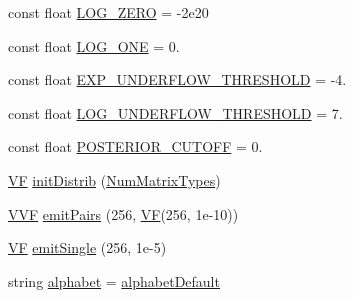 \begin{DoxyCompactItemize}
\item 
const float \hyperlink{namespace_p_r_o_b_c_o_n_s_ae5514101b91c6ae08ed2ee9306d2305d}{L\+O\+G\+\_\+\+Z\+E\+R\+O} = -\/2e20
\item 
const float \hyperlink{namespace_p_r_o_b_c_o_n_s_a5b8b50011bc3908106307aacd3a58d6e}{L\+O\+G\+\_\+\+O\+N\+E} = 0.
\item 
const float \hyperlink{namespace_p_r_o_b_c_o_n_s_a4074cb3928409c0f0b0d7fce9d2576b0}{E\+X\+P\+\_\+\+U\+N\+D\+E\+R\+F\+L\+O\+W\+\_\+\+T\+H\+R\+E\+S\+H\+O\+L\+D} = -\/4.
\item 
const float \hyperlink{namespace_p_r_o_b_c_o_n_s_acbc36709b1c9a80fa2ec8ead6e1a73ee}{L\+O\+G\+\_\+\+U\+N\+D\+E\+R\+F\+L\+O\+W\+\_\+\+T\+H\+R\+E\+S\+H\+O\+L\+D} = 7.
\item 
const float \hyperlink{namespace_p_r_o_b_c_o_n_s_af5a75afbb515bc75473200f8a3ba1993}{P\+O\+S\+T\+E\+R\+I\+O\+R\+\_\+\+C\+U\+T\+O\+F\+F} = 0.
\item 
\hyperlink{namespace_p_r_o_b_c_o_n_s_a7d46b91dfef3fa4038545a492ad12221}{V\+F} \hyperlink{namespace_p_r_o_b_c_o_n_s_a4fa8c099c73924e7f54dc5dbf2377aff}{init\+Distrib} (\hyperlink{namespace_p_r_o_b_c_o_n_s_aa757f46fbcab58d09517a449a680db3b}{Num\+Matrix\+Types})
\item 
\hyperlink{namespace_p_r_o_b_c_o_n_s_a64c77882f700f0f6e9426241c7d7ba1c}{V\+V\+F} \hyperlink{namespace_p_r_o_b_c_o_n_s_ae28575916501eeab36245ba0624d0640}{emit\+Pairs} (256, \hyperlink{namespace_p_r_o_b_c_o_n_s_a7d46b91dfef3fa4038545a492ad12221}{V\+F}(256, 1e-\/10))
\item 
\hyperlink{namespace_p_r_o_b_c_o_n_s_a7d46b91dfef3fa4038545a492ad12221}{V\+F} \hyperlink{namespace_p_r_o_b_c_o_n_s_a60ce52cd8ccb26631e13fecca788f13e}{emit\+Single} (256, 1e-\/5)
\item 
string \hyperlink{namespace_p_r_o_b_c_o_n_s_a1e5ecbd30c93a113dcef4ef53f00d110}{alphabet} = \hyperlink{namespace_p_r_o_b_c_o_n_s_ae29cac54ccf09bf5f57237867b6da88b}{alphabet\+Default}
\end{DoxyCompactItemize}


